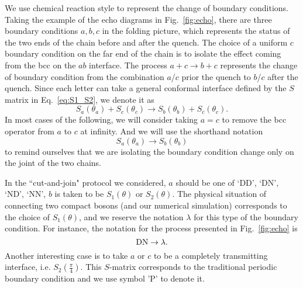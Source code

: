 
We use chemical reaction style to represent the change of boundary conditions. Taking the example of the echo diagrams in Fig.~\ref{fig:echo}, there are three boundary conditions $a,b,c$ in the folding picture, which represents the status of the two ends of the chain before and after the quench. The choice of a uniform $c$ boundary condition on the far end of the chain is to isolate the effect coming from the bcc on the $ab$ interface. The process $a + c \rightarrow b + c$ represents the change of boundary condition from the combination $a$/$c$ prior the quench to $b$/$c$ after the quench. Since each letter can take a general conformal interface defined by the $S$ matrix in Eq.~\eqref{eq:S1_S2}, we denote it as
\begin{equation}
\label{eq:Full_notation_rand()}
S_a( \theta_a ) + S_c( \theta_c) \rightarrow S_b( \theta_b )  + S_c( \theta_c ) .
\end{equation}
In most cases of the following, we will consider taking $a = c$ to remove the bcc operator from $a$ to $c$ at infinity. And we will use the shorthand notation
\begin{equation}
S_a( \theta_a ) \rightarrow S_b( \theta_b )
\end{equation}
to remind ourselves that we are isolating the boundary condition change only on the joint of the two chains. 

In the ``cut-and-join" protocol we considered, $a$ should be one of `DD', `DN', `ND', `NN', $b$ is taken to be $S_1( \theta )$ or $S_2( \theta )$. The physical situation of connecting two compact bosons (and our numerical simulation) corresponds to the choice of $S_1( \theta)$, and we reserve the notation $\lambda$ for this type of the boundary condition. For instance, the notation for the process presented in Fig.~\ref{fig:echo} is
\begin{equation}
\label{eq:DNDN}
 {\rm DN} \rightarrow \lambda.
\end{equation}
Another interesting case is to take $a$ or $c$ to be a completely transmitting interface, i.e. $S_2( \frac{\pi}{4} )$. This $S$-matrix corresponds to the traditional periodic boundary condition and we use symbol 'P' to denote it. 


